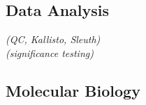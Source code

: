 \documentclass[]{resume}
\begin{document}
\begin{minipage}[t]{0.33\textwidth}
\subsection{Data Analysis}
 {\footnotesize \textit{(QC, Kallisto, Sleuth)}}\\
 {\footnotesize \textit{(significance testing)}}
\sectionsep

\subsection{Molecular Biology}
\\
\\
\\
\sectionsep




%
%

\end{minipage}
\hfill
\end{document}

